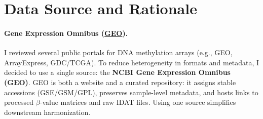 \documentclass[10pt]{extarticle}
\begin{document}
\begin{abstract}
\begin{itemize}[label=-]
  \item \href{https://github.com/elisabettaroviera/THESIS/blob/main/01%20-%20Notebook/00%20-%20Dataset%20Construction%20%26%20Metadata/GSE287331/00-dataset-metadata-GSE287331.ipynb}{\texttt{00-dataset-metadata-GSE287331.ipynb}} — Metadata extraction for GSE287331.

  \item \href{https://github.com/elisabettaroviera/THESIS/blob/main/01%20-%20Notebook/00%20-%20Dataset%20Construction%20%26%20Metadata/00-uniformation-of-the-gse.ipynb}{\texttt{00-uniformation-of-the-gse.ipynb}} — Harmonization of $\beta$-matrices and phenotype tables across GSE datasets for consistent schema and downstream comparability.
\end{itemize}


\noindent
All raw and processed methylation data are available from the NCBI Gene Expression Omnibus (GEO):

\begin{itemize}[label=-]
  \item \href{https://www.ncbi.nlm.nih.gov/geo/query/acc.cgi?acc=GSE69914}{GSE69914} — Illumina 450K, normal vs adjacent vs tumor.
  \item \href{https://www.ncbi.nlm.nih.gov/geo/query/acc.cgi?acc=GSE225845}{GSE225845} — EPIC array, breast tissue methylation (normal, adjacent, tumor).
  \item \href{https://www.ncbi.nlm.nih.gov/geo/query/acc.cgi?acc=GSE287331}{GSE287331} — EPIC array, tumor-proximity axis (HDB–CUB–OQ–AN–TU).
\end{itemize}
\end{abstract}



\section{Data Source and Rationale}

\paragraph{Gene Expression Omnibus (\href{https://www.ncbi.nlm.nih.gov/geo/}{GEO}).}
I reviewed several public portals for DNA methylation arrays (e.g., GEO, ArrayExpress, GDC/TCGA). To reduce heterogeneity in formats and metadata, I decided to use a single source: the \textbf{NCBI Gene Expression Omnibus (GEO)}. GEO is both a website and a curated repository: it assigns stable accessions (GSE/GSM/GPL), preserves sample-level metadata, and hosts links to processed $\beta$-value matrices and raw IDAT files. Using one source simplifies downstream harmonization.
\end{document}
